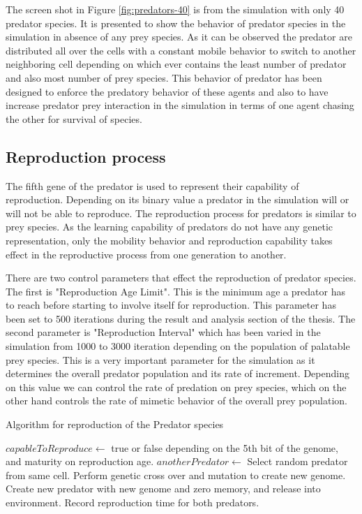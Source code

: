 The screen shot in Figure \ref{fig:predators-40} is from the simulation with only 40 predator species. It is presented to show the behavior of predator species in the simulation in absence of any prey species. As it can be observed the predator are distributed all over the cells with a constant mobile behavior to switch to another neighboring cell depending on which ever contains the least number of predator and also most number of prey species. This behavior of predator has been designed to enforce the predatory behavior of these agents and also to have increase predator prey interaction in the simulation in terms of one agent chasing the other for survival of species. 

\subsection{Reproduction process}
The  fifth gene of the predator is used to represent their capability of reproduction.  Depending on its binary value a predator in the simulation will or will not be able to reproduce. The reproduction process for predators is similar to prey species. As the learning capability of predators do not have any genetic representation, only the mobility behavior and reproduction capability takes effect in the reproductive process from one generation to another. 

There are two control parameters that effect the reproduction of predator species. The first is "Reproduction Age Limit". This is the minimum age a predator has to reach before starting to involve itself for reproduction. This parameter has been set to 500 iterations during the result and analysis section of the thesis. The second parameter is "Reproduction Interval" which has been varied in the simulation from 1000 to 3000 iteration depending on the population of palatable prey species. This is a very important parameter for the simulation as it determines the overall predator population and its rate of increment. Depending on this value we can control the rate of predation on prey species, which on the other hand controls the rate of mimetic behavior of the overall prey population.

\begin{algorithm}[H]
	\caption{Algorithm for reproduction of the Predator species}
	\label{algo:algorithm-reproduction-predator}
	\begin{algorithmic}
			\STATE $capableToReproduce \gets$ true or false depending on the 5th bit of the genome, and maturity on reproduction age.
				\STATE $anotherPredator \gets$ Select random predator from same cell.
					\STATE Perform genetic cross over and mutation to create new genome.
					\STATE Create new predator with new genome and zero memory, and release into environment.
					\STATE Record reproduction time for both predators.
				\ENDIF
			\ENDIF
		\ENDFOR
	\end{algorithmic}
\end{algorithm}

